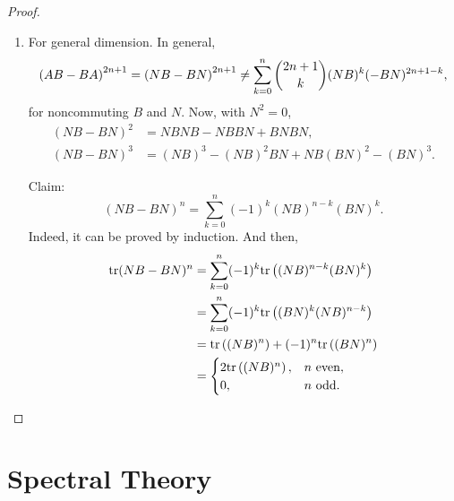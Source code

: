\documentclass[10pt]{book}
\theoremstyle{definition}
\numberwithin{equation}{chapter}
\begin{document}
\begin{proof}
\begin{enumerate}[label=(\alph*)]
    \item For general dimension. In general,
    \begin{align*}
        \left(AB - BA\right)^{2n+1} = \left(NB - BN\right)^{2n+1} \neq \sum^n_{k=0} \dbinom{2n+1}{k} (NB)^k (-BN)^{2n+1-k},
    \end{align*}
    for noncommuting $B$ and $N$. Now, with $N^2 = 0$, 
    \begin{align*}
        (NB - BN)^2 & = NBNB - NBBN + BNBN, \\
        (NB - BN)^3 & = (NB)^3 - (NB)^2BN + NB(BN)^2 - (BN)^3.
    \end{align*}
    
    Claim: $$(NB - BN)^{n} = \sum^n_{k=0} (-1)^k (NB)^{n-k}(BN)^k.$$
    Indeed, it can be proved by induction. And then,
    \begin{align*}
        {\rm tr} (NB - BN)^{n} & = \sum^n_{k=0} (-1)^k {\rm tr} \left((NB)^{n-k}(BN)^k \right) \\
        & = \sum^n_{k=0} (-1)^k {\rm tr} \left((BN)^k (NB)^{n-k} \right) \\
        & = {\rm tr} \left((NB)^n\right) + (-1)^n {\rm tr} \left((BN)^n\right) \\
        & = \begin{cases}
            2 {\rm tr} \left((NB)^n\right), & n \,\, {\rm even}, \\
            0, & n \,\, {\rm odd}.
        \end{cases}
    \end{align*}
\end{enumerate}
\end{proof}

\medskip


\section{Spectral Theory}
\end{document}
